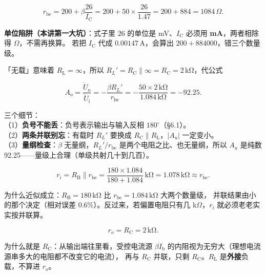 \documentclass[11pt]{ctexart}
\begin{document}

\[ r_{\mathrm{be}}=200+\beta\frac{26}{I_{\mathrm{C}}}=200+50\times\frac{26}{1.47}=200+884=1084\,\Omega . \]

\textbf{单位陷阱（本讲第一大坑）}：式子里 $26$ 的单位是 mV、$I_{\mathrm{C}}$ 必须用 \textbf{mA}，两者相除得 $\Omega$，不需再换算。
若把 $I_{\mathrm{C}}$ 代成 $0.00147\,\mathrm{A}$，会算出 $200+884000$，错三个数量级。


「无载」意味着 $R_{\mathrm{L}}=\infty$，所以 $R_L'=R_{\mathrm{C}}\parallel\infty=R_{\mathrm{C}}=2\,\mathrm{k\Omega}$，代公式

\[ A_o=\frac{\dot{U}_{\mathrm{o}}}{\dot{U}_{\mathrm{i}}}=-\frac{\beta R_L'}{r_{\mathrm{be}}}
=-\frac{50\times2\,\mathrm{k\Omega}}{1.084\,\mathrm{k\Omega}}=-92.25 . \]

三个细节：\\
（1）\textbf{负号不能丢}：负号表示输出与输入反相 $180^\circ$（§6.1）。\\
（2）\textbf{两条并联别忘}：有载时 $R_L'$ 要换成 $R_{\mathrm{C}}\parallel R_{\mathrm{L}}$，$|A_u|$ 一定变小。\\
（3）\textbf{量纲检查}：$\beta$ 无量纲，$R_L'/r_{\mathrm{be}}$ 是两个电阻之比、也无量纲，所以 $A_u$ 是纯数 92.25——量级上合理（单级共射几十到几百）。


\[ r_i=R_{\mathrm{B}}\parallel r_{\mathrm{be}}=\frac{180\times1.084}{180+1.084}\,\mathrm{k\Omega}=1.078\,\mathrm{k\Omega}\approx r_{\mathrm{be}} . \]

为什么近似成立：$R_{\mathrm{B}}=180\,\mathrm{k\Omega}$ 比 $r_{\mathrm{be}}=1.084\,\mathrm{k\Omega}$ 大两个数量级，
并联结果由小的那个决定（相对误差 $0.6\%$）。反过来，若偏置电阻只有几 k$\Omega$，$r_i$ 就必须老老实实按并联算。


\[ r_o=R_{\mathrm{C}}=2\,\mathrm{k\Omega} . \]

为什么就是 $R_{\mathrm{C}}$：从输出端往里看，受控电流源 $\beta\dot{I}_{\mathrm{b}}$ 的内阻视为无穷大（理想电流源串多大的电阻都不改变它的电流），
再与 $R_{\mathrm{C}}$ 并联，只剩 $R_{\mathrm{C}}$。$R_{\mathrm{L}}$ 是\textbf{外接}负载，不算进 $r_o$。
\end{document}
